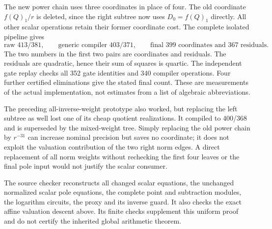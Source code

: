 The new power chain uses three coordinates in place of four. The old
coordinate $f(Q)_1/r$ is deleted, since the right subtree now uses
$D_0=f(Q)_1$ directly. All other scalar operations retain their former
coordinate cost. The complete isolated pipeline gives
\[
 \text{raw }413/381,\qquad
 \text{generic compiler }403/371,\qquad
 \boxed{\text{final }399\text{ coordinates and }367\text{ residuals}}.
\]
The two numbers in the first two pairs are coordinates and residuals.
The residuals are quadratic, hence their sum of squares is quartic.
The independent gate replay checks all 352 gate identities and 340
compiler operations. Four further certified eliminations give the
stated final count. These are measurements of the actual implementation,
not estimates from a list of algebraic abbreviations.

The preceding all-inverse-weight prototype also worked, but replacing
the left subtree as well lost one of its cheap quotient realizations.
It compiled to 400/368 and is superseded by the mixed-weight tree.
Simply replacing the old power chain by $r^{-31}$ can increase nominal
precision but saves no coordinate; it does not exploit the valuation
contribution of the two right norm edges. A direct replacement of all
norm weights without rechecking the first four leaves or the final pole
input would not justify the scalar consumer.

The source checker reconstructs all changed scalar equations, the
unchanged normalized scalar pole equations, the complete point and
subtraction modules, the logarithm circuits, the proxy and its inverse
guard. It also checks the exact affine valuation descent above. Its
finite checks supplement this uniform proof and do not certify the
inherited global arithmetic theorem.
